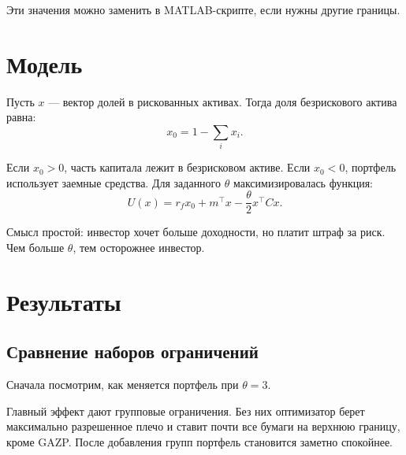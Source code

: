 \documentclass[12pt,a4paper]{article}
\begin{document}
Эти значения можно заменить в MATLAB-скрипте, если нужны другие границы.

\section{Модель}

Пусть $x$ --- вектор долей в рискованных активах. Тогда доля безрискового актива равна:
\[
x_0 = 1 - \sum_i x_i.
\]

Если $x_0 > 0$, часть капитала лежит в безрисковом активе. Если $x_0 < 0$, портфель использует заемные средства. Для заданного $\theta$ максимизировалась функция:
\[
U(x) = r_f x_0 + m^\top x - \frac{\theta}{2}x^\top Cx.
\]

Смысл простой: инвестор хочет больше доходности, но платит штраф за риск. Чем больше $\theta$, тем осторожнее инвестор.

\section{Результаты}

\subsection{Сравнение наборов ограничений}

Сначала посмотрим, как меняется портфель при $\theta = 3$.

\begin{table}[H]
    \centering
    \small
    \caption{Влияние ограничений на результат при $\theta = 3$}
\end{table}

Главный эффект дают групповые ограничения. Без них оптимизатор берет максимально разрешенное плечо и ставит почти все бумаги на верхнюю границу, кроме GAZP. После добавления групп портфель становится заметно спокойнее.
\end{document}
